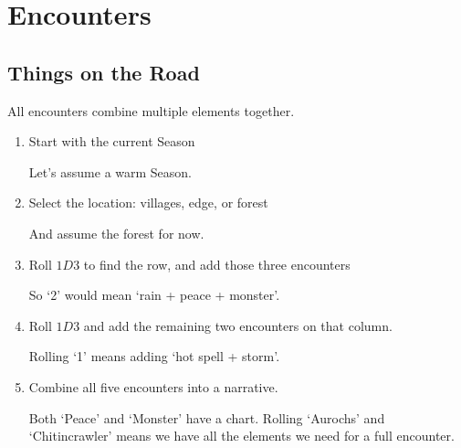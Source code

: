 \chapter[Encounters at the Crossroads]{Encounters}
\label{encounters}

\section{Things on the Road}

\begin{multicols}{2}

All encounters combine multiple elements together.

\begin{enumerate}
  \item
  Start with the current Season

  \begin{exampletext}
    Let's assume a warm Season.
  \end{exampletext}
  \item
  Select the location: villages, edge, or forest

  \begin{exampletext}
    And assume the forest for now.
  \end{exampletext}
  \item
  Roll $1D3$ to find the row, and add those three encounters

  \begin{exampletext}
    So `2' would mean `rain + peace + monster'.
  \end{exampletext}

  \item
  Roll $1D3$ and add the remaining two encounters on that column.

  \begin{exampletext}
    Rolling `1' means adding `hot spell + storm'.
  \end{exampletext}

  \item
  Combine all five encounters into a narrative.

  \begin{exampletext}
    Both `Peace' and `Monster' have a chart.
    Rolling `Aurochs' and `Chitincrawler' means we have all the elements we need for a full encounter.
  \end{exampletext}

\end{enumerate}


\end{multicols}
